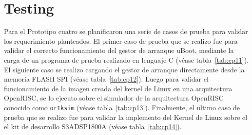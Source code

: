 		\section{Testing}	
Para el Prototipo cuatro se planificaron una serie de casos de prueba para validar los requerimiento planteados. El primer caso de prueba que se realizo fue para validar el correcto funcionamiento del gestor de arranque uBoot, mediante la carga de un programa de prueba realizado en lenguaje C (véase tabla~\ref{tab:cp11}). El siguiente caso se realizo cargando el gestor de arranque directamente desde la memoria FLASH SPI (véase tabla~\ref{tab:cp12}). Luego para validar el funcionamiento de la imagen creada del kernel de Linux en una arquitectura OpenRISC, se lo ejecuto sobre el simulador de la arquitectura OpenRISC conocido como \verb|or1ksim| (véase tabla~\ref{tab:cp13}). Finalmente, el ultimo caso de prueba que se realizo fue para validar la implemento del Kernel de Linux sobre el el kit de desarrollo S3ADSP1800A (véase tabla~\ref{tab:cp14}).

